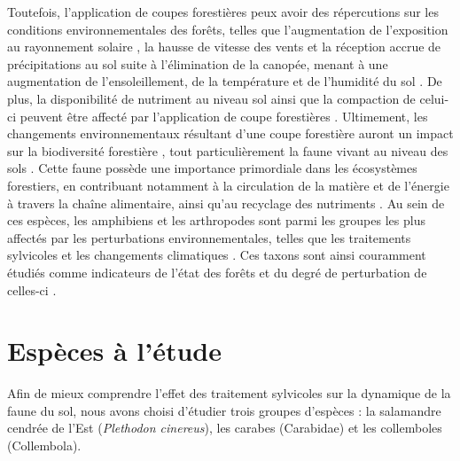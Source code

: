 Toutefois, l'application de coupes forestières peux avoir des répercutions sur les conditions environnementales des forêts, 
telles que l'augmentation de l'exposition au rayonnement solaire , la hausse de vitesse des vents et la réception accrue de précipitations au sol suite à l'élimination de la canopée, 
menant à une augmentation de l'ensoleillement, de la température et de l'humidité du sol \citep{Keenan1993ecologicaleffects,Lindo2003Microbialbiomass,Heithecker2007Edgerelatedgradients}.
De plus, la disponibilité de nutriment au niveau sol ainsi que la compaction de celui-ci peuvent être affecté par l'application de coupe forestières \citep{Battigelli2004Shorttermimpact,Covington1981Changesforest,Lindo2003Microbialbiomass,rousseauLongtermEffectsBiomass2018}. 
Ultimement, les changements environnementaux résultant d'une coupe forestière auront un impact sur la biodiversité forestière \citep{Chaudhary2016Impactforest,Fedrowitz2014Canretention,Paillet2010Biodiversitydifferences}, 
tout particulièrement la faune vivant au niveau des sols \citep{Chaudhary2016ImpactforestLindo2003Microbialbiomass,Kudrin2023metaanalysiseffects}.
Cette faune possède une importance primordiale dans les écosystèmes forestiers, en contribuant notamment à la circulation de la matière et de l'énergie à travers la chaîne alimentaire, ainsi qu'au recyclage des nutriments \citep{Kudrin2023metaanalysiseffects,Seibold2021contributioninsects}.
Au sein de ces espèces, les amphibiens et les arthropodes sont parmi les groupes les plus affectés par les perturbations environnementales, 
telles que les traitements sylvicoles \citep{Hartshorn2021reviewforest,Semlitsch2009Effectstimber,Stuart2004Statustrends} et les changements climatiques \citep{Alford1999Globalamphibian,Milanovich2010Projectedloss,Parmesan2006EcologicalEvolutionary,Pounds2006Widespreadamphibian,Warren2018projectedeffect}. 
Ces taxons sont ainsi couramment étudiés comme indicateurs de l'état des forêts et du degré de perturbation de celles-ci \citep{birdChangesSoilLitter2004,Maleque2009Arthropodsbioindicators,pongeVerticalDistributionCollembola2000}.


\section*{Espèces à l'étude}
\label{sec:species}

Afin de mieux comprendre l'effet des traitement sylvicoles sur la dynamique de la faune du sol, nous avons choisi d'étudier trois groupes d'espèces : la salamandre cendrée de l'Est (\textit{Plethodon cinereus}), 
les carabes (Carabidae) et les collemboles (Collembola).

